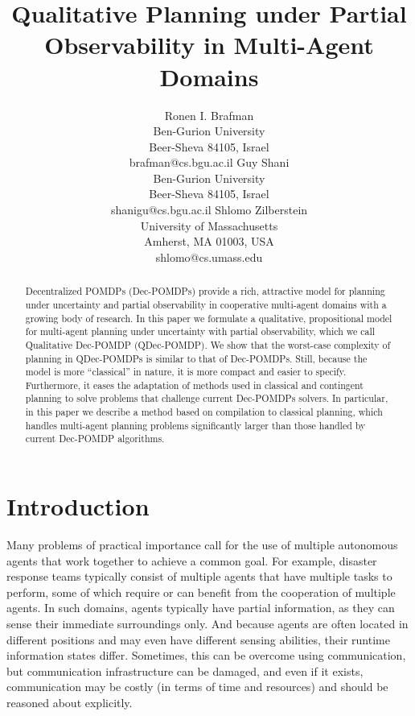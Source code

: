 \documentclass[letterpaper]{article}
\title{Qualitative Planning under Partial Observability in Multi-Agent Domains}
\author{
Ronen I. Brafman \\
      Ben-Gurion University \\
      Beer-Sheva 84105, Israel\\
      brafman@cs.bgu.ac.il
\And Guy Shani\\
      Ben-Gurion University \\
      Beer-Sheva 84105, Israel\\
      shanigu@cs.bgu.ac.il
\And
Shlomo Zilberstein\\
      University of Massachusetts\\
      Amherst, MA 01003, USA\\
      shlomo@cs.umass.edu}
\theoremstyle{definition}
\begin{document}
\maketitle

\begin{abstract}
Decentralized POMDPs (Dec-POMDPs) provide a rich, attractive model for planning under uncertainty and partial observability in cooperative multi-agent domains with a growing body of research. In this paper we formulate a qualitative, propositional model for multi-agent planning under uncertainty with partial observability, which we call Qualitative Dec-POMDP (QDec-POMDP). We show that the worst-case complexity of planning in QDec-POMDPs is similar to that of Dec-POMDPs. Still, because the model is more ``classical'' in nature, it is more compact and easier to specify.  Furthermore, it eases the adaptation of methods used in classical and contingent planning to solve problems %
that challenge current Dec-POMDPs solvers.
In particular, in this paper we describe a method based on compilation to classical planning, which handles multi-agent planning problems significantly larger than those handled by current Dec-POMDP algorithms.
\end{abstract}

\section{Introduction}
Many problems of practical importance call for the use of multiple autonomous agents that work together to achieve a common goal.
For example, disaster response teams typically consist of multiple agents that have multiple tasks to perform,
some of which
require or can benefit from the cooperation of multiple agents. In such domains, agents typically have partial information, as they can sense their immediate surroundings only.
And because agents are often located in different positions and may even have different sensing abilities, their runtime information states differ.  Sometimes, this can be overcome using communication, but communication infrastructure can be damaged, and even if it exists,
communication may be costly (in terms of time and resources) and should be reasoned about explicitly.
\end{document}
